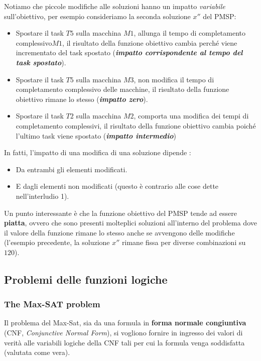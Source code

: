 \documentclass{article}
\begin{document}
Notiamo che piccole modifiche alle soluzioni hanno un impatto \textit{variabile} sull'obiettivo, per esempio
consideriamo la seconda soluzione $x''$ del PMSP:
\begin{itemize}
    \item Spostare il task $T5$ sulla macchina $M1$, allunga il tempo di completamento complessivo$M1$,
          il risultato della funzione obiettivo cambia perché viene incrementato del task spostato (\textit{\textbf{impatto corrispondente al tempo del task spostato}}).
    \item Spostare il task $T5$ sulla macchina $M3$, non modifica il tempo di completamento complessivo
          delle macchine, il risultato della funzione obiettivo rimane lo stesso (\textit{\textbf{impatto zero}}).
    \item Spostare il task $T2$ sulla macchina $M2$, comporta una modifica dei tempi di completamento
          complessivi, il risultato della funzione obiettivo cambia poiché l'ultimo task viene spostato (\textit{\textbf{impatto intermedio}})

\end{itemize}

In fatti, l'impatto di una modifica di una soluzione dipende :
\begin{itemize}
    \item Da entrambi gli elementi modificati.
    \item E dagli elementi non modificati (questo è contrario alle cose dette nell'interludio 1).
\end{itemize}

Un punto interessante è che la funzione obiettivo del PMSP tende ad essere \textbf{piatta}, ovvero che sono presenti
molteplici soluzioni all'interno del problema dove il valore della funzione rimane lo stesso anche se avvengono
delle modifiche (l'esempio precedente, la soluzione $x''$ rimane fissa per diverse combinazioni su $120$).

\subsection{Problemi delle funzioni logiche}
\subsubsection{The Max-SAT problem}
Il problema del Max-Sat, sia da una formula in \textbf{forma normale congiuntiva}
(CNF, \textit{Conjunctive Normal Form}), si vogliono fornire in ingresso dei valori di
verità alle variabili logiche della CNF tali per cui la formula venga
soddisfatta (valutata come vera).
\end{document}
